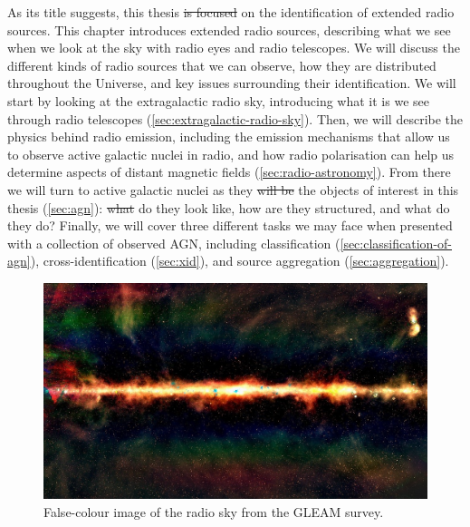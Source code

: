 \documentclass[11pt, a4paper]{book}
\providecommand{\DIFaddtex}[1]{{\protect\color{blue}\uwave{#1}}} %
\providecommand{\DIFdeltex}[1]{{\protect\color{red}\sout{#1}}}                      %
\providecommand{\DIFaddbegin}{} %
\providecommand{\DIFaddend}{} %
\providecommand{\DIFdelbegin}{} %
\providecommand{\DIFdelend}{} %
\providecommand{\DIFadd}[1]{\texorpdfstring{\DIFaddtex{#1}}{#1}} %
\providecommand{\DIFdel}[1]{\texorpdfstring{\DIFdeltex{#1}}{}} %
\newcommand{\DIFscaledelfig}{0.5}
\newlength{\DIFdelgraphicswidth} %
\newlength{\DIFdelgraphicsheight} %
\newcommand{\DIFaddincludegraphics}[2][]{{\color{blue}\fbox{\DIFOincludegraphics[#1]{#2}}}} %
\newcommand{\DIFdelincludegraphics}[2][]{%
\sbox{\DIFdelgraphicsbox}{\DIFOincludegraphics[#1]{#2}}%
\settoboxwidth{\DIFdelgraphicswidth}{\DIFdelgraphicsbox} %
\settoboxtotalheight{\DIFdelgraphicsheight}{\DIFdelgraphicsbox} %
\scalebox{\DIFscaledelfig}{%
\parbox[b]{\DIFdelgraphicswidth}{\usebox{\DIFdelgraphicsbox}\\[-\baselineskip] \rule{\DIFdelgraphicswidth}{0em}}\llap{\resizebox{\DIFdelgraphicswidth}{\DIFdelgraphicsheight}{%
\setlength{\unitlength}{\DIFdelgraphicswidth}%
\begin{picture}(1,1)%
\thicklines\linethickness{2pt} %
{\color[rgb]{1,0,0}\put(0,0){\framebox(1,1){}}}%
{\color[rgb]{1,0,0}\put(0,0){\line( 1,1){1}}}%
{\color[rgb]{1,0,0}\put(0,1){\line(1,-1){1}}}%
\end{picture}%
}\hspace*{3pt}}} %
} %
\DeclareRobustCommand{\DIFaddbegin}{\DIFOaddbegin \let\includegraphics\DIFaddincludegraphics} %
\DeclareRobustCommand{\DIFaddend}{\DIFOaddend \let\includegraphics\DIFOincludegraphics} %
\DeclareRobustCommand{\DIFdelbegin}{\DIFOdelbegin \let\includegraphics\DIFdelincludegraphics} %
\DeclareRobustCommand{\DIFdelend}{\DIFOaddend \let\includegraphics\DIFOincludegraphics} %
\begin{document}
    As its title suggests, this thesis \DIFdelbegin \DIFdel{is focused }\DIFdelend \DIFaddbegin \DIFadd{focuses }\DIFaddend on the identification of extended radio sources. This chapter introduces extended radio sources, describing what we see when we look at the sky with radio eyes and radio telescopes. We will discuss the different kinds of radio sources that we can observe, how they are distributed throughout the Universe, and key issues surrounding their identification. We will start by looking at the extragalactic radio sky, introducing what it is \DIFaddbegin \DIFadd{that }\DIFaddend we see through radio telescopes (\autoref{sec:extragalactic-radio-sky}). Then, we will describe the physics behind radio emission, including the emission mechanisms that allow us to observe active galactic nuclei in radio, and how radio polarisation can help us determine aspects of distant magnetic fields (\autoref{sec:radio-astronomy}). From there we will turn to active galactic nuclei as they \DIFdelbegin \DIFdel{will be }\DIFdelend \DIFaddbegin \DIFadd{are }\DIFaddend the objects of interest in this thesis (\autoref{sec:agn}): \DIFdelbegin \DIFdel{what }\DIFdelend \DIFaddbegin \DIFadd{What }\DIFaddend do they look like, how are they structured, and what do they do? Finally, we will cover three different tasks we may face when presented with a collection of observed AGN, including classification (\autoref{sec:classification-of-agn}), cross-identification (\autoref{sec:xid}), and source aggregation (\autoref{sec:aggregation}).

    \begin{figure}[ht]
        \includegraphics[width=\textwidth]{images/gleam.jpg}
        \caption[False-colour image of the radio sky from the GLEAM survey.]{\label{fig:gleam} False-colour image of the radio sky from the GLEAM survey. \citep[Image: Natasha Hurley-Walker, Curtin University/ICRAR;][]{hurley-walker_galactic_2017}}
    \end{figure}
\end{document}
